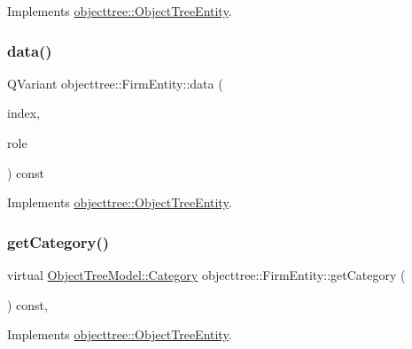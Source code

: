Implements \mbox{\hyperlink{classobjecttree_1_1_object_tree_entity_a70fd25eccf88b305e9db15fbe3daeae8}{objecttree\+::\+Object\+Tree\+Entity}}.

\mbox{\label{classobjecttree_1_1_firm_entity_a002cd38e68797084065eec0872150270}} 
\subsubsection{\texorpdfstring{data()}{data()}}
{\footnotesize\ttfamily Q\+Variant objecttree\+::\+Firm\+Entity\+::data (\begin{DoxyParamCaption}\item[{const Q\+Model\+Index \&}]{index,  }\item[{int}]{role }\end{DoxyParamCaption}) const\hspace{0.3cm}{\ttfamily [virtual]}}



Implements \mbox{\hyperlink{classobjecttree_1_1_object_tree_entity_a2413c6573de18b451d97eb3800f10f35}{objecttree\+::\+Object\+Tree\+Entity}}.

\mbox{\label{classobjecttree_1_1_firm_entity_afb530ac7e5dd4c94421c0db1b21ae54e}} 
\subsubsection{\texorpdfstring{getCategory()}{getCategory()}}
{\footnotesize\ttfamily virtual \mbox{\hyperlink{class_object_tree_model_a379e9d6b0d381853785adf62095ba4e3}{Object\+Tree\+Model\+::\+Category}} objecttree\+::\+Firm\+Entity\+::get\+Category (\begin{DoxyParamCaption}{ }\end{DoxyParamCaption}) const\hspace{0.3cm}{\ttfamily [inline]}, {\ttfamily [virtual]}}



Implements \mbox{\hyperlink{classobjecttree_1_1_object_tree_entity_aa4e80e7fa80672c1b9902add665abc77}{objecttree\+::\+Object\+Tree\+Entity}}.

